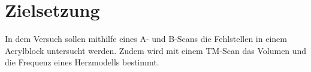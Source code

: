 
\section{Zielsetzung}
\label{sec:Zielsetzung}

In dem Versuch sollen mithilfe eines A- und B-Scans die Fehlstellen in einem Acrylblock untersucht werden. Zudem wird mit einem TM-Scan das Volumen und die Frequenz eines Herzmodells bestimmt.